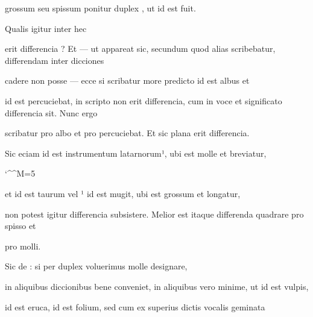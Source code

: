 \splitlines

grossum seu spissum ponitur duplex , ut  id est fuit.

Qualis igitur inter hec

\fulllines
erit differencia ? Et — ut appareat sic, secundum quod alias scribebatur, differendam inter dicciones

cadere non posse — ecce si scribatur more predicto  id est albus et 

id est percuciebat, in scripto non erit differencia, cum in voce et significato differencia sit. Nunc ergo

scribatur  pro albo et  pro percuciebat. Et sic plana erit differencia.

Sic eciam  id est instrumentum latarnorum¹, ubi est   molle et  breviatur,


\catcode `\^^M=5


\obeylines

et  id est taurum vel ¹ id est mugit, ubi est  grossum et  longatur,

non potest igitur differencia subsistere. Melior est itaque differenda  quadrare pro spisso et 

\splitlines
{} pro molli.

\indentK Sic de : si per duplex  voluerimus  molle designare,

\fulllines
in aliquibus diccionibus bene conveniet, in aliquibus vero minime, ut  id est vulpis,

 id est eruca,  id est folium, sed cum ex superius dictis vocalis geminata

